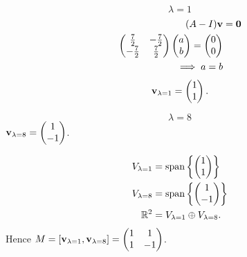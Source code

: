 \documentclass[10pt, a4paper]{article}
\begin{document}
\begin{problem}
\begin{solution}
\begin{enumerate}[label = (\alph*)]
            \[
            \lambda = 1
            \]
            \begin{align*}
                (A - I)\mathbf{v} &= \mathbf{0} \\
                \begin{pmatrix}
                    \frac{7}{2} & -\frac{7}{2} \\
                    -\frac{7}{2} & \frac{7}{2}
                 \end{pmatrix}
                 \begin{pmatrix}
                     a \\ b
                 \end{pmatrix} = \begin{pmatrix}
                     0 \\ 0
                 \end{pmatrix} \\
                 \implies a = b
            \end{align*}
            \[
            \mathbf{v}_{\lambda = 1} = \begin{pmatrix}
                1 \\ 1
            \end{pmatrix}.
            \]
    
            \[
            \lambda = 8
            \]
            $\mathbf{v}_{\lambda = 8} = \begin{pmatrix}
                1 \\ -1
            \end{pmatrix}$.
            
            \begin{align*}
                V_{\lambda = 1} &= \mathrm{span}\left\{\begin{pmatrix}
                    1 \\ 1
                \end{pmatrix}\right\} \\
                V_{\lambda = 8} &= \mathrm{span}\left\{\begin{pmatrix}
                    1 \\ -1
                \end{pmatrix}\right\} \\
                \mathbb{R} ^ 2 &= V_{\lambda = 1} \oplus V_{\lambda = 8}.
            \end{align*}
            Hence
            $M = [\mathbf{v}_{\lambda = 1}, \mathbf{v}_{\lambda = 8}] = \begin{pmatrix}
                1 & 1 \\ 1 & -1
            \end{pmatrix}$.


\end{enumerate}
\end{solution}
\end{problem}
\end{document}
